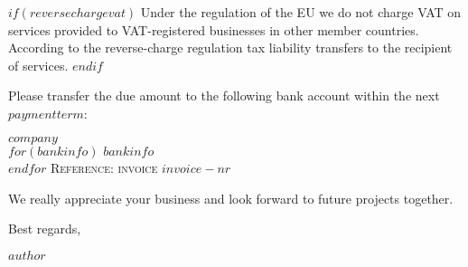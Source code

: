 \documentclass[12, a4paper]{article}
\begin{document}
\vspace{10mm}

$if(reversechargevat)$
Under the regulation of the EU we do not charge VAT on services provided to VAT-registered businesses in other member countries. According to the reverse-charge regulation tax liability transfers to the recipient of services.
$endif$

\begin{minipage}{\textwidth}
  Please transfer the due amount to the following bank account within the next $paymentterm$:

\vspace{5mm}

\textsc{\textbf{$company$}}\\
$for(bankinfo)$
\textsc{$bankinfo$}\\
$endfor$
\textsc{Reference: invoice $invoice-nr$}
\end{minipage}

\vspace{5mm}

\begin{minipage}{\textwidth}
  We really appreciate your business and look forward to future projects together.

  Best regards,

\vspace{5mm}

$author$
\end{minipage}
\end{document}

